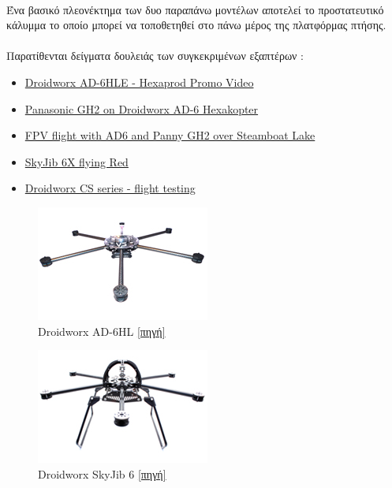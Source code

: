 \documentclass[a4paper, 12pt, twoside]{report}
\begin{document}
{{{{{{			\paragraph{}{Ένα βασικό πλεονέκτημα των δυο παραπάνω μοντέλων αποτελεί το προστατευτικό κάλυμμα το οποίο μπορεί να τοποθετηθεί στο πάνω μέρος της πλατφόρμας πτήσης.
			}
			\paragraph{}{Παρατίθενται δείγματα δουλειάς των συγκεκριμένων εξαπτέρων :
				\begin{itemize}
					\item \href{http://vimeo.com/moogaloop.swf?clip_id=29893580&server=vimeo.com&show_title=1&show_byline=1&autoplay=1}{Droidworx AD-6HLE - Hexaprod Promo Video}
					\item \href{https://vimeo.com/20411633}{Panasonic GH2 on Droidworx AD-6 Hexakopter}
					\item \href{https://vimeo.com/20921788}{FPV flight with AD6 and Panny GH2 over Steamboat Lake}
					\item \href{https://vimeo.com/42030489}{SkyJib 6X flying Red}
					\item \href{https://vimeo.com/25265975}{Droidworx CS series - flight testing}
				\end{itemize}
			}
			\begin{figure}[hp]
					\centering
					\includegraphics[scale=0.50]{Droidworx_AD_6HL.png}
					\caption{Droidworx AD-6HL \href{http://www.droidworx.com.au/shop/components/com_virtuemart/shop_image/product/AD_6_Heavy_Lift__4e2f78f506a46.jpg}{[πηγή]}}
					\label{φωτ:Droidworx AD-6HL}
			\end{figure}
			\begin{figure}[hp]
					\centering
					\includegraphics[scale=0.50]{Droidworx_skyjib6.png}
					\caption{Droidworx SkyJib 6 \href{http://www.droidworx.com.au/shop/components/com_virtuemart/shop_image/product/SkyJib_6_for_Ret_4f1e21acba3d6.jpg}{[πηγή]}}
					\label{φωτ:SkyJib 6}
			\end{figure}
			
}}}}}}
\end{document}
